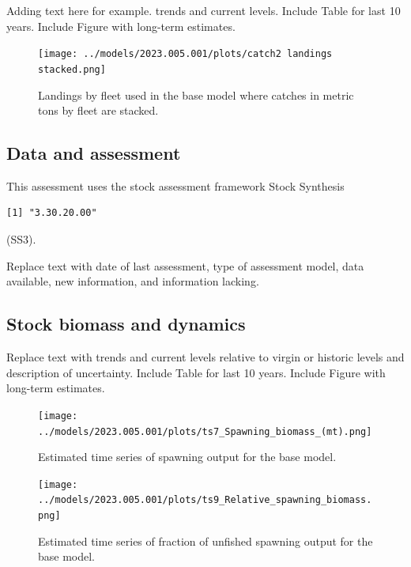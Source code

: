 \documentclass[11pt,
  english,
  letterpaper,
]{article}
\begin{document}
Adding text here for example. trends and current levels. Include Table for last 10 years. Include Figure with long-term estimates.

\clearpage



\begin{figure}
\centering
\texttt{[image: ../models/2023.005.001/plots/catch2 landings stacked.png]}
\caption{Landings by fleet used in the base model where catches in metric tons by fleet are stacked.\label{fig:es-catch}}
\end{figure}

\clearpage

\hypertarget{data-and-assessment}{%
\subsection*{Data and assessment}\label{data-and-assessment}}

This assessment uses the stock assessment framework Stock Synthesis

\begin{verbatim}
[1] "3.30.20.00"
\end{verbatim}

(SS3).

Replace text with date of last assessment, type of assessment model, data available, new information, and information lacking.

\hypertarget{stock-biomass-and-dynamics}{%
\subsection*{Stock biomass and dynamics}\label{stock-biomass-and-dynamics}}

Replace text with trends and current levels relative to virgin or historic levels and description of uncertainty. Include Table for last 10 years. Include Figure with long-term estimates.



\begin{figure}
\centering
\texttt{[image: ../models/2023.005.001/plots/ts7\_Spawning\_biomass\_(mt).png]}
\caption{Estimated time series of spawning output for the base model.\label{fig:es-ssb}}
\end{figure}

\begin{figure}
\centering
\texttt{[image: ../models/2023.005.001/plots/ts9\_Relative\_spawning\_biomass.png]}
\caption{Estimated time series of fraction of unfished spawning output for the base model.\label{fig:es-depl}}
\end{figure}
\end{document}
